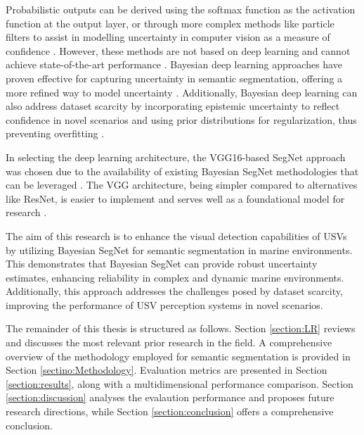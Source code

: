 Probabilistic outputs can be derived using the softmax function as the activation function at the output layer, 
or through more complex methods like particle filters to assist in modelling uncertainty in computer vision as a 
measure of confidence \cite{particlefilter}. However, these methods are not based on deep learning and cannot 
achieve state-of-the-art performance \cite{resnet}. Bayesian deep learning approaches have proven effective 
for capturing uncertainty in semantic segmentation, offering a more refined way to model uncertainty 
\cite{whatuncertaintydoweneed}. Additionally, Bayesian deep learning can also address dataset scarcity by 
incorporating epistemic uncertainty to reflect confidence in novel scenarios and using prior distributions 
for regularization, thus preventing overfitting \cite{overfitting}. 

In selecting the deep learning architecture, the VGG16-based SegNet approach was chosen due to the availability 
of existing Bayesian SegNet methodologies that can be leveraged \cite{VGG,SegNet}. The VGG architecture, being 
simpler compared to alternatives like ResNet, is easier to implement and serves well as a foundational model for 
research \cite{vggcompare}. 

The aim of this research is to enhance the visual detection capabilities of USVs by utilizing Bayesian 
SegNet for semantic segmentation in marine environments. This demonstrates that Bayesian SegNet 
can provide robust uncertainty estimates, enhancing reliability in complex and dynamic marine environments. 
Additionally, this approach addresses the challenges posed by dataset scarcity, improving the performance of 
USV perception systems in novel scenarios.

The remainder of this thesis is structured as follows. Section \ref{section:LR} reviews and discusses the most 
relevant prior research in the field. A comprehensive overview of the methodology employed for semantic segmentation
is provided in Section \ref{sectino:Methodology}. Evaluation metrics are presented in Section \ref{section:results}, 
along with a multidimensional performance comparison. Section \ref{section:discussion} analyses the evalaution 
performance and proposes future research directions, while Section \ref{section:conclusion} offers a comprehensive 
conclusion.